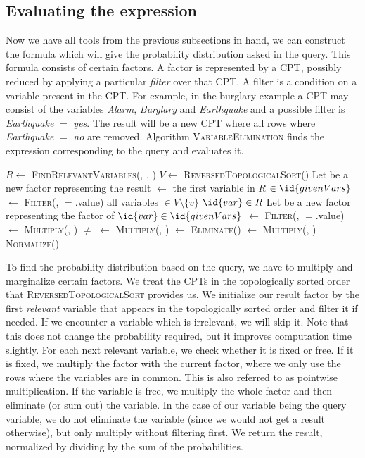 \documentclass[10pt,a4paper]{article}
\begin{document}
\subsection{Evaluating the expression}
Now we have all tools from the previous subsections in hand, we can construct the formula which will give the probability distribution asked in the query. This formula consists of certain factors. A factor is represented by a CPT, possibly reduced by applying a particular \emph{filter} over that CPT. A filter is a condition on a variable present in the CPT. For example, in the burglary example a CPT may consist of the variables \emph{Alarm}, \emph{Burglary} and \emph{Earthquake} and a possible filter is \emph{Earthquake} $=$ \emph{yes}. The result will be a new CPT where all rows where \emph{Earthquake} $=$ \emph{no} are removed. Algorithm \textsc{VariableElimination} finds the expression corresponding to the query and evaluates it.
\begin{codebox}
\li $R \gets $ \textsc{FindRelevantVariables}(, , )
\li $V \gets $ \textsc{ReversedTopologicalSort}()
\li Let  be a new factor representing the result
\li {} $\gets$ the first variable  in $R$
\zi
\li \If {} $\in \id{givenVars}$ \Then
\li	{} $\gets$ \textsc{Filter}(, $=$.value)
\End
\zi
\li \For all variables  $\in V \setminus \{v\}$ \Do 
\li	\If $\id{var} \in R$ \Then
\li	Let  be a new factor representing the factor of 
\li		\If $\id{var} \in \id{givenVars}$ \Then
\li			 {} $\gets$ \textsc{Filter}(, \id{var}$=$.value) 
\li			 {} $\gets$ \textsc{Multiply}(, )
		\End
\li	\Else \If {} $\neq$  \Then
\li		{} $\gets$ \textsc{Multiply}(, )
\li		{} $\gets$ \textsc{Eliminate}()
\li	\Else 
\li		{} $\gets$ \textsc{Multiply}(, )
	\End
	\End
\End
\zi
\li \Return \textsc{Normalize}()
\end{codebox}
To find the probability distribution based on the query, we have to multiply and marginalize certain factors. We treat the CPTs in the topologically sorted order that \textsc{ReversedTopologicalSort} provides us. We initialize our result factor by the first \emph{relevant} variable that appears in the topologically sorted order and filter it if needed. If we encounter a variable which is irrelevant, we will skip it. Note that this does not change the probability required, but it improves computation time slightly. For each next relevant variable, we check whether it is fixed or free. If it is fixed, we multiply the factor with the current factor, where we only use the rows where the variables are in common. This is also referred to as pointwise multiplication. If the variable is free, we multiply the whole factor and then eliminate (or sum out) the variable. In the case of our variable being the query variable, we do not eliminate the variable (since we would not get a result otherwise), but only multiply without filtering first. We return the result, normalized by dividing by the sum of the probabilities.
\end{document}
